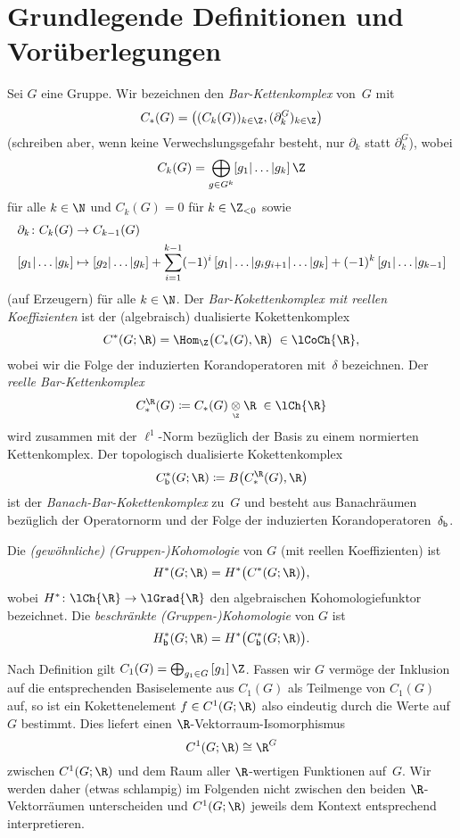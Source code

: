 \section{Grundlegende Definitionen und Vorüberlegungen}
\label{ch3:basics}%
%
Sei $G$ eine Gruppe. Wir bezeichnen den \emph{Bar-Kettenkomplex} von~$G$ mit 
\[ C_\ast(G) = \bigl( (C_k(G))_{k\in\Z}, (\partial_k^G)_{k\in\Z} \bigr)  \]
(schreiben aber, wenn keine Verwechslungsgefahr besteht, nur $\partial_k$
statt $\partial_k^G$), wobei 
\[ C_k(G) = \bigoplus_{g\in G^k} [g_1|\ldots|g_k]\,\Z \]
für alle $k\in\N$ und $C_k(G) = 0$ für $k\in\Z_{<0}$ sowie
\begin{align*}
    \partial_k\colon C_k(G) &\to C_{k-1}(G)
    \\
    [g_1|\ldots|g_k] &\mapsto [g_2|\ldots|g_k]
    + \sum_{i=1}^{k-1} (-1)^i \, [g_1|\ldots|g_ig_{i+1}|\ldots|g_k]
    + (-1)^k \, [g_1|\ldots|g_{k-1}]
\end{align*}
(auf Erzeugern) für alle $k\in\N$. Der \emph{Bar-Kokettenkomplex mit reellen
Koeffizienten} ist der (algebraisch) dualisierte Kokettenkomplex
\[ C^\ast(G;\R) = \Hom_\Z\bigl( C_\ast(G), \R \bigr)  \;\in\lCoCh{\R} , \]
wobei wir die Folge der induzierten Korandoperatoren mit~$\delta$ bezeichnen.
Der \emph{reelle Bar-Kettenkomplex}
\[ C_\ast^{\R}(G)
    \defeq C_\ast(G) \underset{\scriptscriptstyle\Z}\otimes \R
    \;\in\lCh{\R}
\]
wird zusammen mit der $\ell^1$-Norm bezüglich der Basis zu einem
normierten Kettenkomplex. Der topologisch dualisierte Kokettenkomplex
\[ \Cb^\ast(G;\R) \defeq B\bigl( C_\ast^{\R}(G), \R \bigr) \]
ist der \emph{Banach-Bar-Kokettenkomplex} zu~$G$ und
besteht aus Banachräumen bezüglich der Operatornorm und der Folge der
induzierten Korandoperatoren~$\delta_{\mathsf{b}}$.

Die \emph{(gewöhnliche) (Gruppen-)Kohomologie} von $G$ (mit reellen
Koeffizienten) ist
\[ H^\ast(G;\R) = H^\ast\bigl( C^\ast(G;\R) \bigr)  , \]
wobei $H^\ast\colon\lCh{\R}\to\lGrad{\R}$ den algebraischen Kohomologiefunktor
bezeichnet. Die \emph{beschränkte (Gruppen-)Kohomologie} von $G$ ist
\[ \Hb^\ast(G;\R) = H^\ast\bigl( \Cb^\ast(G;\R) \bigr)  . \]

Nach Definition gilt $C_1(G) = \bigoplus_{g_1\in G}\, [g_1]\,\Z$. Fassen wir
$G$ vermöge der Inklusion auf die entsprechenden Basiselemente aus $C_1(G)$
als Teilmenge von $C_1(G)$ auf, so ist ein Kokettenelement $f\in C^1(G;\R)$ also 
eindeutig durch die Werte auf $G$ bestimmt. Dies liefert einen
$\R$-Vektorraum-Isomorphismus 
\[ C^1(G;\R) \cong \R^G  \]
zwischen $C^1(G;\R)$ und dem Raum aller $\R$-wertigen Funktionen auf~$G$.
Wir werden daher (etwas schlampig) im Folgenden nicht zwischen den beiden
$\R$-Vektorräumen unterscheiden und $C^1(G;\R)$ jeweils dem Kontext entsprechend
interpretieren.

